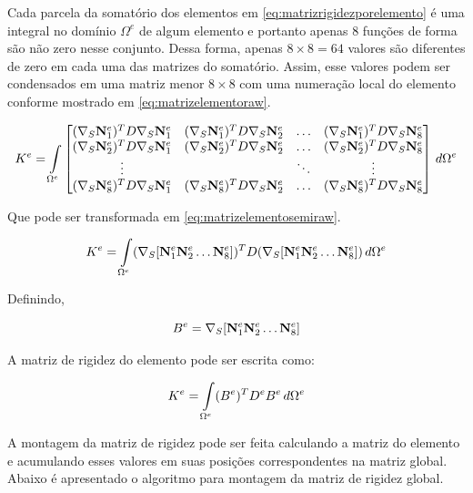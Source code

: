 Cada parcela da somatório dos elementos em \eqref{eq:matrizrigidezporelemento} é uma integral no domínio $\Omega^e$ de algum elemento e portanto apenas 8 funções de forma são não zero nesse conjunto. Dessa forma, apenas $8\times8=64$ valores são diferentes de zero em cada uma das matrizes do somatório. Assim, esse valores podem ser condensados em uma matriz menor $8\times8$ com uma numeração local do elemento conforme mostrado em \eqref{eq:matrizelementoraw}.

\begin{equation}\label{eq:matrizelementoraw}
    K^e =
\omeeint{
\begin{bmatrix}
\kije{1}{1} & \kije{1}{2}  & \hdots & \kije{1}{8}  \\
\kije{2}{1} & \kije{2}{2}  & \hdots & \kije{2}{8}  \\
\vdots      &              & \ddots & \vdots       \\
\kije{8}{1} & \kije{8}{2}  & \hdots & \kije{8}{8}
\end{bmatrix}
}
\end{equation}

Que pode ser transformada em \eqref{eq:matrizelementosemiraw}.

\begin{equation}\label{eq:matrizelementosemiraw}
    K^e =\omeeint{ (\sopnabla [\basefunctionelem[1] \basefunctionelem[2] \hdots \basefunctionelem[8] ]) ^T D (\sopnabla [\basefunctionelem[1] \basefunctionelem[2] \hdots \basefunctionelem[8]])}
\end{equation}

Definindo,

\begin{equation}
    B^e = \sopnabla [\basefunctionelem[1] \basefunctionelem[2] \hdots \basefunctionelem[8] ]
\end{equation}

A matriz de rigidez do elemento pode ser escrita como:

\begin{equation} \label{eq:}
    K^e = \omeeint{(B^e)^T D^e B^e}
\end{equation}


A montagem da matriz de rigidez pode ser feita calculando a matriz do elemento e acumulando esses valores em suas posições correspondentes na matriz global. Abaixo é apresentado  o algoritmo para montagem da matriz de rigidez global.

\vspace{1cm}
\noindent{}
\vspace{1cm}


